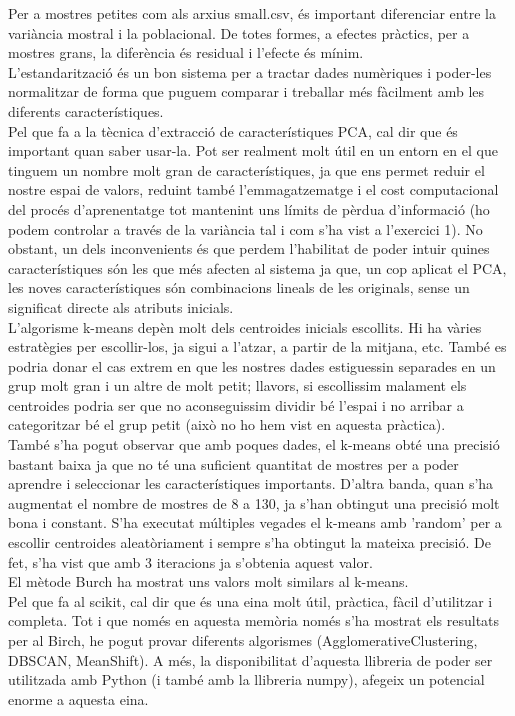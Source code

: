 \documentclass{article} %
\begin{document}
{\color{blue}
	Per a mostres petites com als arxius small.csv, és important diferenciar entre la variància mostral i la poblacional. De totes formes, a efectes pràctics, per a mostres grans, la diferència és residual i l'efecte és mínim. \\

	L'estandarització és un bon sistema per a tractar dades numèriques i poder-les normalitzar de forma que puguem comparar i treballar més fàcilment amb les diferents característiques. \\

	Pel que fa a la tècnica d'extracció de característiques PCA, cal dir que és important quan saber usar-la. Pot ser realment molt útil en un entorn en el que tinguem un nombre molt gran de característiques, ja que ens permet reduir el nostre espai de valors, reduint també l'emmagatzematge i el cost computacional del procés d'aprenentatge tot mantenint uns límits de pèrdua d'informació (ho podem controlar a través de la variància tal i com s'ha vist a l'exercici 1). No obstant, un dels inconvenients és que perdem l'habilitat de poder intuir quines característiques són les que més afecten al sistema ja que, un cop aplicat el PCA, les noves característiques són combinacions lineals de les originals, sense un significat directe als atributs inicials. \\

	L'algorisme k-means depèn molt dels centroides inicials escollits. Hi ha vàries estratègies per escollir-los, ja sigui a l'atzar, a partir de la mitjana, etc. També es podria donar el cas extrem en que les nostres dades estiguessin separades en un grup molt gran i un altre de molt petit; llavors, si escollissim malament els centroides podria ser que no aconseguissim dividir bé l'espai i no arribar a categoritzar bé el grup petit (això no ho hem vist en aquesta pràctica). \\

	També s'ha pogut observar que amb poques dades, el k-means obté una precisió bastant baixa ja que no té una suficient quantitat de mostres per a poder aprendre i seleccionar les característiques importants. D'altra banda, quan s'ha augmentat el nombre de mostres de 8 a 130, ja s'han obtingut una precisió molt bona i constant. S'ha executat múltiples vegades el k-means amb 'random' per a escollir centroides aleatòriament i sempre s'ha obtingut la mateixa precisió. De fet, s'ha vist que amb 3 iteracions ja s'obtenia aquest valor. \\

	El mètode Burch ha mostrat uns valors molt similars al k-means. \\

	Pel que fa al scikit, cal dir que és una eina molt útil, pràctica, fàcil d'utilitzar i completa. Tot i que només en aquesta memòria només s'ha mostrat els resultats per al Birch, he pogut provar diferents algorismes (AgglomerativeClustering, DBSCAN, MeanShift). A més, la disponibilitat d'aquesta llibreria de poder ser utilitzada amb Python (i també amb la llibreria numpy), afegeix un potencial enorme a aquesta eina.
}
\end{document}
